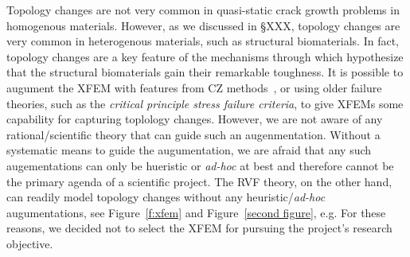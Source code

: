 \documentclass[10pt,letterpaper]{article}
\begin{document}
    Topology changes are not very common in quasi-static crack growth problems in homogenous materials. However, as we discussed in \S XXX,  topology changes are very common in heterogenous materials, such  as structural biomaterials. In fact,  topology changes are a key feature of the  mechanisms  through which  hypothesize that the structural biomaterials  gain their remarkable   toughness. It is possible to augument the XFEM with features from CZ methods~\cite{wells2001new,moes2002extended,mariani2003extended}, or using older failure theories, such as the  \textit{critical principle stress failure criteria}, to give XFEMs some capability  for capturing toplology changes. However, we are not aware of any rational/scientific  theory that can guide such an augenmentation. Without a systematic means  to  guide the augumentation, we are afraid  that any such augementations can only be  hueristic or \textit{ad-hoc}  at best and therefore cannot be the primary agenda of a scientific project. The  RVF theory, on the other hand, can readily model topology  changes without any heuristic/\textit{ad-hoc} augumentations, see  Figure~\ref{f:xfem} and Figure~\ref{second figure}, e.g.   For these reasons, we decided not to select the XFEM for  pursuing  the  project's research objective.
\end{document}
